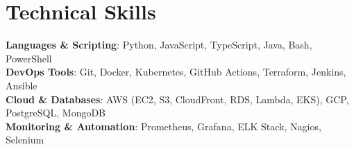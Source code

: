 \documentclass[letterpaper,11pt]{article}
\begin{document}
\section{Technical Skills}
 \begin{itemize}[leftmargin=0.15in, label={}]
    \small{\item{
     \textbf{Languages \& Scripting}{: Python, JavaScript, TypeScript, Java, Bash, PowerShell} \\
     \textbf{DevOps Tools}{: Git, Docker, Kubernetes, GitHub Actions, Terraform, Jenkins, Ansible} \\
     \textbf{Cloud \& Databases}{: AWS (EC2, S3, CloudFront, RDS, Lambda, EKS), GCP, PostgreSQL, MongoDB} \\
     \textbf{Monitoring \& Automation}{: Prometheus, Grafana, ELK Stack, Nagios, Selenium}
    }}
 \end{itemize}


\end{document}
